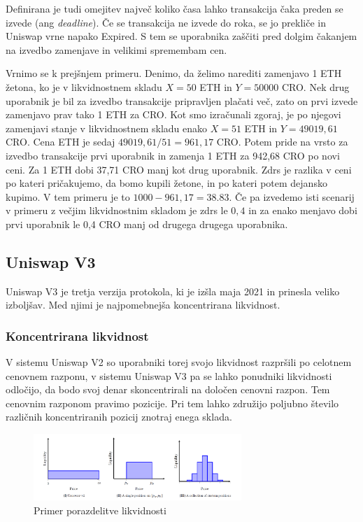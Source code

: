 \documentclass[a4paper,12pt]{article}%
\begin{document}
Definirana je tudi omejitev največ koliko časa lahko transakcija čaka preden se izvede (ang \textit{deadline}). Če se transakcija ne izvede do roka, se jo prekliče in Uniswap vrne napako Expired. S tem se uporabnika zaščiti pred dolgim čakanjem na izvedbo zamenjave in velikimi spremembam cen.

\medskip

Vrnimo se k prejšnjem primeru. Denimo, da želimo narediti zamenjavo 1 ETH žetona, ko je v likvidnostnem skladu $X = 50$ ETH in $Y = 50 000$ CRO. Nek drug uporabnik je bil za izvedbo transakcije pripravljen plačati več, zato on prvi izvede zamenjavo prav tako 1 ETH za CRO. Kot smo izračunali zgoraj, je po njegovi zamenjavi stanje v likvidnostnem skladu enako $X = 51$ ETH in $Y = 49019,61$ CRO. Cena ETH je sedaj $49019,61/51 = 961,17$ CRO. Potem pride na vrsto za izvedbo transakcije prvi uporabnik in zamenja 1 ETH za 942,68 CRO po novi ceni. Za 1 ETH dobi 37,71 CRO manj kot drug uporabnik.
Zdrs je razlika v ceni po kateri pričakujemo, da bomo kupili žetone, in po kateri potem dejansko kupimo. V tem primeru je to $1000 - 961,17 = 38.83$. 
Če pa izvedemo isti scenarij v primeru z večjim likvidnostnim skladom je zdrs le $0,4$ in za enako menjavo dobi prvi uporabnik le 0,4 CRO manj od drugega drugega uporabnika.

\subsection{Uniswap V3}

Uniswap V3 je tretja verzija protokola, ki je izšla maja 2021 in prinesla veliko izboljšav. Med njimi je najpomebnejša koncentrirana likvidnost. 

\subsubsection{Koncentrirana likvidnost}

V sistemu Uniswap V2 so uporabniki torej svojo likvidnost razpršili po celotnem cenovnem razponu, v sistemu Uniswap V3 pa se lahko ponudniki likvidnosti odločijo, da bodo svoj denar skoncentrirali na določen cenovni razpon. Tem cenovnim razponom pravimo pozicije. 
Pri tem lahko združijo poljubno število različnih koncentriranih pozicij znotraj enega sklada.

\begin{figure}[!ht]
    \centering
    \includegraphics[width=0.7\textwidth]{pozicije.png}
        \caption{Primer porazdelitve likvidnosti}  
\end{figure}
\end{document}
